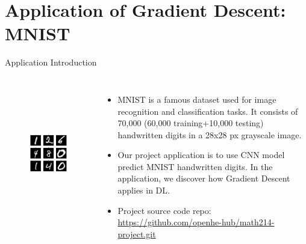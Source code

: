 \documentclass{beamer}
\begin{document}
\section{Application of Gradient Descent: MNIST}
\begin{frame}{Application Introduction}
	\begin{columns}[T,onlytextwidth]
		\begin{figure}
			\centering 
			\includegraphics[width=1\columnwidth,height=6cm]{img/mnist.jpg}
			\caption{}
		\end{figure}
	
		\begin{itemize}
			\item MNIST is a famous dataset used for image
			recognition and classification tasks. It consists 
			of 70,000 (60,000 training+10,000 testing) 
			handwritten digits in a 28x28 px grayscale image.
			\item Our project application is to use CNN model
			predict MNIST handwritten digits. In the application,
			we discover how Gradient Descent applies in DL.
			\item Project source code repo: \href{https://github.com/openhe-hub/math214-project.git}{https://github.com/openhe-hub/math214-project.git} 
		\end{itemize}
	\end{columns}	
\end{frame}
\end{document}
